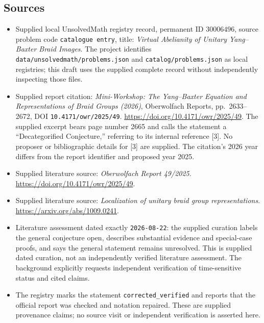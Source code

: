 \documentclass[11pt]{article}
\begin{document}
\subsection{Sources}
\begin{itemize}
\item Supplied local UnsolvedMath registry record, permanent ID \(30006496\), source problem code \texttt{catalogue entry}, title: \emph{Virtual Abelianity of Unitary Yang--Baxter Braid Images}. The project identifies \texttt{data/unsolvedmath/problems.json} and \texttt{catalog/problems.json} as local registries; this draft uses the supplied complete record without independently inspecting those files.
\item Supplied report citation: \emph{Mini-Workshop: The Yang--Baxter Equation and Representations of Braid Groups (2026)}, Oberwolfach Reports, pp.\ 2633--2672, DOI \texttt{10.4171/owr/2025/49}. \url{https://doi.org/10.4171/owr/2025/49}. The supplied excerpt bears page number 2665 and calls the statement a ``Decategorified Conjecture,'' referring to its internal reference [3]. No proposer or bibliographic details for [3] are supplied. The citation's 2026 year differs from the report identifier and proposed year 2025.
\item Supplied literature source: \emph{Oberwolfach Report 49/2025}. \url{https://doi.org/10.4171/owr/2025/49}.
\item Supplied literature source: \emph{Localization of unitary braid group representations}. \url{https://arxiv.org/abs/1009.0241}.
\item Literature assessment dated exactly \texttt{2026-08-22}: the supplied curation labels the general conjecture open, describes substantial evidence and special-case proofs, and says the general statement remains unresolved. This is supplied dated curation, not an independently verified literature assessment. The background explicitly requests independent verification of time-sensitive status and cited claims.
\item The registry marks the statement \texttt{corrected\_verified} and reports that the official report was checked and notation repaired. These are supplied provenance claims; no source visit or independent verification is asserted here.
\end{itemize}
\end{document}
